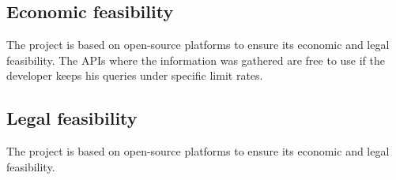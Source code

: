 \subsection{Economic feasibility}
\nonzeroparskip The project is based on open-source platforms to ensure its economic and legal feasibility. The APIs where the information was gathered are free to use if the developer keeps his queries under specific limit rates.

\subsection{Legal feasibility}
\nonzeroparskip The project is based on open-source platforms to ensure its economic and legal feasibility. 

